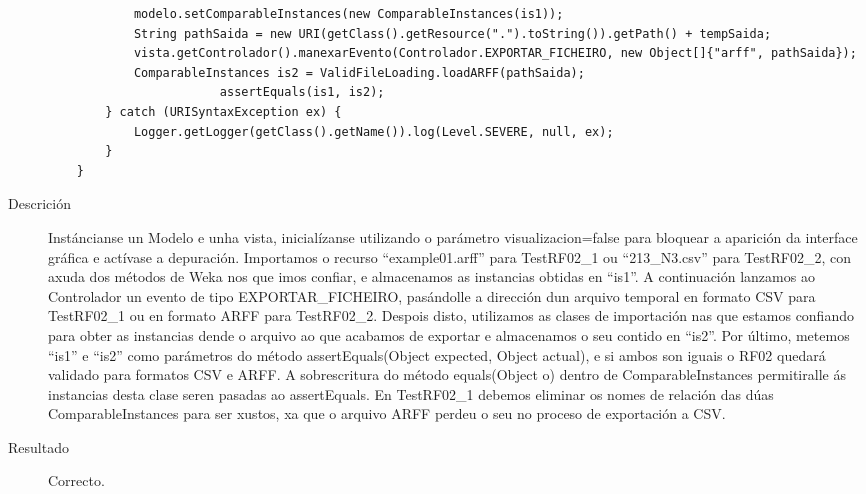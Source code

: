 \begin{description}
\begin{lstlisting}
            modelo.setComparableInstances(new ComparableInstances(is1));
            String pathSaida = new URI(getClass().getResource(".").toString()).getPath() + tempSaida;
            vista.getControlador().manexarEvento(Controlador.EXPORTAR_FICHEIRO, new Object[]{"arff", pathSaida});
            ComparableInstances is2 = ValidFileLoading.loadARFF(pathSaida);
						assertEquals(is1, is2);
        } catch (URISyntaxException ex) {
            Logger.getLogger(getClass().getName()).log(Level.SEVERE, null, ex);
        }
    }
\end{lstlisting}
\item[Descrición]
Instáncianse un Modelo e unha vista, inicialízanse utilizando o parámetro visualizacion=false para bloquear a aparición da interface gráfica e actívase a depuración. Importamos o recurso ``example01.arff'' para TestRF02\_1 ou ``213\_N3.csv'' para TestRF02\_2, con axuda dos métodos de Weka nos que imos confiar, e almacenamos as instancias obtidas en ``is1''. A continuación lanzamos ao Controlador un evento de tipo EXPORTAR\_FICHEIRO, pasándolle a dirección dun arquivo temporal en formato CSV para TestRF02\_1 ou en formato ARFF para TestRF02\_2. Despois disto, utilizamos as clases de importación nas que estamos confiando para obter as instancias dende o arquivo ao que acabamos de exportar e almacenamos o seu contido en ``is2''. Por último, metemos ``is1'' e ``is2'' como parámetros do método assertEquals(Object expected, Object actual), e si ambos son iguais o RF02 quedará validado para formatos CSV e ARFF. A sobrescritura do método equals(Object o) dentro de ComparableInstances permitiralle ás instancias desta clase seren pasadas ao assertEquals. En TestRF02\_1 debemos eliminar os nomes de relación das dúas ComparableInstances para ser xustos, xa que o arquivo ARFF perdeu o seu no proceso de exportación a CSV.
\item[Resultado]
Correcto.
\end{description}

